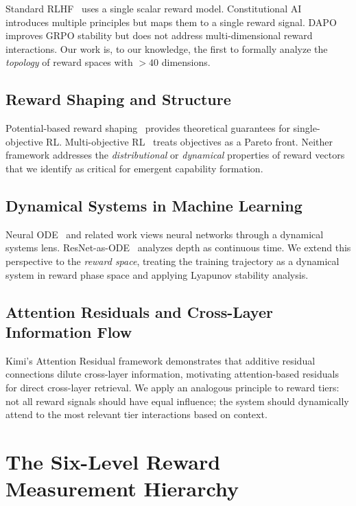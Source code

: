 \documentclass{article}
\begin{document}
Standard RLHF~\cite{ouyang2022training} uses a single scalar reward model. Constitutional AI~\cite{bai2022constitutional} introduces multiple principles but maps them to a single reward signal. DAPO~\cite{yu2025dapo} improves GRPO stability but does not address multi-dimensional reward interactions. Our work is, to our knowledge, the first to formally analyze the \emph{topology} of reward spaces with $>40$ dimensions.

\subsection{Reward Shaping and Structure}

Potential-based reward shaping~\cite{ng1999policy} provides theoretical guarantees for single-objective RL. Multi-objective RL~\cite{hayes2022practical} treats objectives as a Pareto front. Neither framework addresses the \emph{distributional} or \emph{dynamical} properties of reward vectors that we identify as critical for emergent capability formation.

\subsection{Dynamical Systems in Machine Learning}

Neural ODE~\cite{chen2018neural} and related work views neural networks through a dynamical systems lens. ResNet-as-ODE~\cite{lu2018beyond} analyzes depth as continuous time. We extend this perspective to the \emph{reward space}, treating the training trajectory as a dynamical system in reward phase space and applying Lyapunov stability analysis.

\subsection{Attention Residuals and Cross-Layer Information Flow}

Kimi's Attention Residual framework demonstrates that additive residual connections dilute cross-layer information, motivating attention-based residuals for direct cross-layer retrieval. We apply an analogous principle to reward tiers: not all reward signals should have equal influence; the system should dynamically attend to the most relevant tier interactions based on context.

\section{The Six-Level Reward Measurement Hierarchy}
\label{sec:framework}
\end{document}

